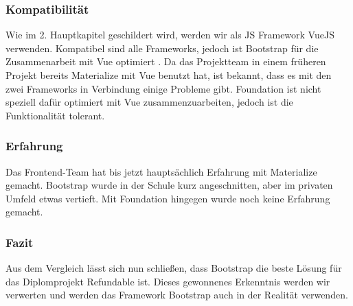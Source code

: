 \subsubsection{Kompatibilität}
Wie im 2. Hauptkapitel geschildert wird, werden wir als JS Framework VueJS verwenden. Kompatibel sind alle Frameworks, jedoch ist Bootstrap für die Zusammenarbeit mit Vue optimiert \cite{bootstrap-docu}. Da das Projektteam in einem früheren Projekt bereits Materialize mit Vue benutzt hat, ist bekannt, dass es mit den zwei Frameworks in Verbindung einige Probleme gibt. Foundation ist nicht speziell dafür optimiert mit Vue zusammenzuarbeiten, jedoch ist die Funktionalität tolerant.  

\subsubsection{Erfahrung}
Das Frontend-Team hat bis jetzt hauptsächlich Erfahrung mit Materialize gemacht. Bootstrap wurde in der Schule kurz angeschnitten, aber im privaten Umfeld etwas vertieft. Mit Foundation hingegen wurde noch keine Erfahrung gemacht.

\subsubsection{Fazit}
Aus dem Vergleich lässt sich nun schließen, dass Bootstrap die beste Lösung für das Diplomprojekt Refundable ist. Dieses gewonnenes Erkenntnis werden wir verwerten und werden das Framework Bootstrap auch in der Realität verwenden.

